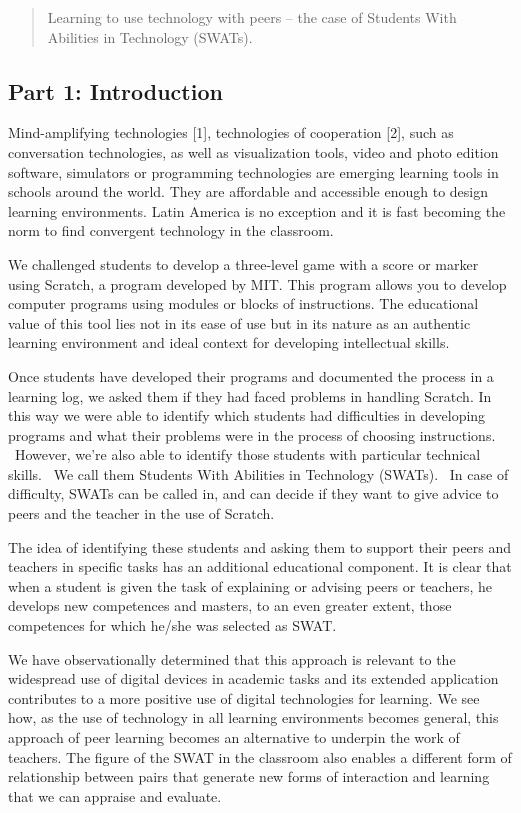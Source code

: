 \begin{quote}
Learning to use technology with peers -- the case of Students With
Abilities in Technology (SWATs).
\end{quote}

\hypertarget{part-1-introduction}{%
\subsection{Part 1: Introduction}\label{part-1-introduction}}

Mind-amplifying technologies {{[}1{]}}, technologies of cooperation
{{[}2{]}}, such as conversation technologies, as well as visualization
tools, video and photo edition software, simulators or programming
technologies are emerging learning tools in schools around the world.
They are affordable and accessible enough to design learning
environments. Latin America is no exception and it is fast becoming the
norm to find convergent technology in the classroom.

We challenged students to develop a three-level game with a score or
marker using Scratch, a program developed by MIT. This program allows
you to develop computer programs using modules or blocks of
instructions. The educational value of this tool lies not in its ease of
use but in its nature as an authentic learning environment and ideal
context for developing intellectual skills.

Once students have developed their programs and documented the process
in a learning log, we asked them if they had faced problems in handling
Scratch. In this way we were able to identify which students had
difficulties in developing programs and what their problems were in the
process of choosing instructions. ~However, we're also able to identify
those students with particular technical skills. ~We call them Students
With Abilities in Technology (SWATs). ~In case of difficulty, SWATs can
be called in, and can decide if they want to give advice to peers and
the teacher in the use of Scratch.

The idea of identifying these students and asking them to support their
peers and teachers in specific tasks has an additional educational
component. It is clear that when a student is given the task of
explaining or advising peers or teachers, he develops new competences
and masters, to an even greater extent, those competences for which
he/she was selected as SWAT.

We have observationally determined that this approach is relevant to the
widespread use of digital devices in academic tasks and its extended
application contributes to a more positive use of digital technologies
for learning. We see how, as the use of technology in all learning
environments becomes general, this approach of peer learning becomes an
alternative to underpin the work of teachers. The figure of the SWAT in
the classroom also enables a different form of relationship between
pairs that generate new forms of interaction and learning that we can
appraise and evaluate.

